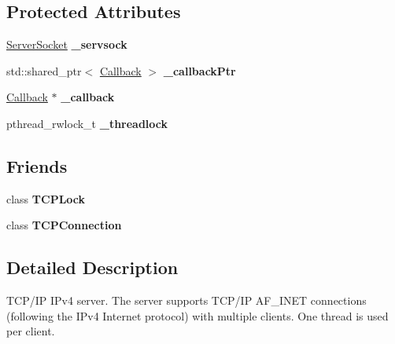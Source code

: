 \subsection*{Protected Attributes}
\begin{DoxyCompactItemize}
\item 
\mbox{\label{classcppu_1_1_t_c_p_server_a8e4422abf23dc5bd195d05a3e9eee167}} 
\mbox{\hyperlink{classcppu_1_1_server_socket}{Server\+Socket}} {\bfseries \+\_\+servsock}
\item 
\mbox{\label{classcppu_1_1_t_c_p_server_abe36d427d7b047cdd342e282611c841e}} 
std\+::shared\+\_\+ptr$<$ \mbox{\hyperlink{structcppu_1_1_t_c_p_server_1_1_callback}{Callback}} $>$ {\bfseries \+\_\+callback\+Ptr}
\item 
\mbox{\label{classcppu_1_1_t_c_p_server_a68940bd70ac6941ca49d1e51b631f5e9}} 
\mbox{\hyperlink{structcppu_1_1_t_c_p_server_1_1_callback}{Callback}} $\ast$ {\bfseries \+\_\+callback}
\item 
\mbox{\label{classcppu_1_1_t_c_p_server_aea2dbb4b5762044217096e52cd559b97}} 
pthread\+\_\+rwlock\+\_\+t {\bfseries \+\_\+threadlock}
\end{DoxyCompactItemize}
\subsection*{Friends}
\begin{DoxyCompactItemize}
\item 
\mbox{\label{classcppu_1_1_t_c_p_server_a94abdeb80587f39a869fde6f24522a78}} 
class {\bfseries T\+C\+P\+Lock}
\item 
\mbox{\label{classcppu_1_1_t_c_p_server_a9d1c27bdfcdd48c5f07a5d0dce43b346}} 
class {\bfseries T\+C\+P\+Connection}
\end{DoxyCompactItemize}


\subsection{Detailed Description}
T\+C\+P/\+IP I\+Pv4 server. The server supports T\+C\+P/\+IP A\+F\+\_\+\+I\+N\+ET connections (following the I\+Pv4 Internet protocol) with multiple clients. One thread is used per client. 

